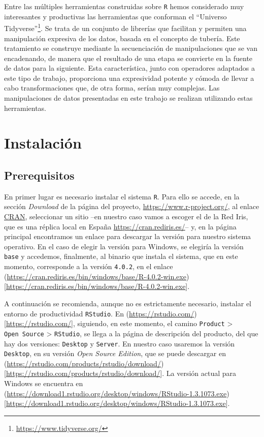\documentclass[
]{article}
\begin{document}
Entre las múltiples herramientas construidas sobre \texttt{R} hemos
considerado muy interesantes y productivas las herramientas que
conforman el ``Universo Tidyverse''\footnote{\url{https://www.tidyverse.org/}}.
Se trata de un conjunto de librerías que facilitan y permiten una
manipulación expresiva de los datos, basada en el concepto de tubería.
Este tratamiento se construye mediante la secuenciación de
manipulaciones que se van encadenando, de manera que el resultado de una
etapa se convierte en la fuente de datos para la siguiente. Esta
característica, junto con operadores adaptados a este tipo de trabajo,
proporciona una expresividad potente y cómoda de llevar a cabo
transformaciones que, de otra forma, serían muy complejas. Las
manipulaciones de datos presentadas en este trabajo se realizan
utilizando estas herramientas.

\hypertarget{instalaciuxf3n}{%
\section{Instalación}\label{instalaciuxf3n}}

\hypertarget{prerequisitos}{%
\subsection{Prerequisitos}\label{prerequisitos}}

En primer lugar es necesario instalar el sistema \texttt{R}. Para ello
se accede, en la sección \emph{Download} de la página del proyecto,
\url{https://www.r-project.org/}, al enlace
\href{http://cran.r-project.org/mirrors.html}{CRAN}, seleccionar un
sitio --en nuestro caso vamos a escoger el de la Red Iris, que es una
réplica local en España \url{https://cran.rediris.es/}-- y, en la página
principal encontramos un enlace para descargar la versión para nuestro
sistema operativo. En el caso de elegir la versión para Windows, se
elegiría la versión \texttt{base} y accedemos, finalmente, al binario
que instala el sistema, que en este momento, corresponde a la versión
\texttt{4.0.2}, en el enlace
(\url{https://cran.rediris.es/bin/windows/base/R-4.0.2-win.exe}){[}\url{https://cran.rediris.es/bin/windows/base/R-4.0.2-win.exe}{]}.

A continuación se recomienda, aunque no es estrictamente necesario,
instalar el entorno de productividad \texttt{RStudio}. En
(\url{https://rstudio.com/}){[}\url{https://rstudio.com/}{]}, siguiendo,
en este momento, el camino \texttt{Product} \textgreater{}
\texttt{Open\ Source} \textgreater{} \texttt{RStudio}, se llega a la
página de descripción del producto, del que hay dos versiones:
\texttt{Desktop} y \texttt{Server}. En nuestro caso usaremos la versión
\texttt{Desktop}, en su versión \emph{Open Source Edition}, que se puede
descargar en
(\url{https://rstudio.com/products/rstudio/download/}){[}\url{https://rstudio.com/products/rstudio/download/}{]}.
La versión actual para Windows se encuentra en
(\url{https://download1.rstudio.org/desktop/windows/RStudio-1.3.1073.exe}){[}\url{https://download1.rstudio.org/desktop/windows/RStudio-1.3.1073.exe}{]}.
\end{document}
